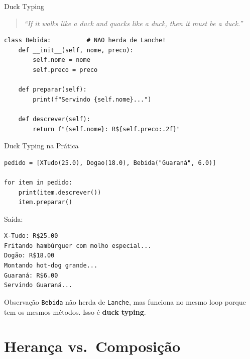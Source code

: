 \documentclass[aspectratio=169]{beamer}
\begin{document}
\begin{frame}[fragile]{Duck Typing}
  \begin{quote}
    \emph{``If it walks like a duck and quacks like a duck, then it must be a duck.''}
  \end{quote}

  \bigskip

  \begin{lstlisting}
class Bebida:          # NAO herda de Lanche!
    def __init__(self, nome, preco):
        self.nome = nome
        self.preco = preco

    def preparar(self):
        print(f"Servindo {self.nome}...")

    def descrever(self):
        return f"{self.nome}: R${self.preco:.2f}"
  \end{lstlisting}
\end{frame}

\begin{frame}[fragile,shrink=10]{Duck Typing na Prática}
  \begin{lstlisting}
pedido = [XTudo(25.0), Dogao(18.0), Bebida("Guaraná", 6.0)]

for item in pedido:
    print(item.descrever())
    item.preparar()
  \end{lstlisting}

  Saída:
  \begin{lstlisting}[numbers=none]
X-Tudo: R$25.00
Fritando hambúrguer com molho especial...
Dogão: R$18.00
Montando hot-dog grande...
Guaraná: R$6.00
Servindo Guaraná...
  \end{lstlisting}

  \begin{alertblock}{Observação}
    \texttt{Bebida} não herda de \texttt{Lanche}, mas funciona no mesmo loop porque tem os mesmos métodos. Isso é \textbf{duck typing}.
  \end{alertblock}
\end{frame}

\section{Herança vs.\ Composição}
\end{document}
